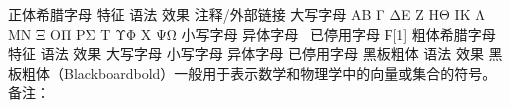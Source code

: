 正体希腊字母
特征	语法	效果	注释/外部链接
大写字母
\Alpha \Beta \Gamma \Delta \Epsilon \Zeta \Eta\Theta	\Alpha\Beta\Gamma\Delta\Epsilon\Zeta\Eta\Theta\!	
ΑΒ Γ ΔΕ Ζ ΗΘ
\Iota \Kappa \Lambda \Mu \Nu \Xi \Omicron \Pi	\Iota\Kappa\Lambda\Mu\Nu\Xi\Omicron\Pi\!	
ΙΚ Λ ΜΝ Ξ ΟΠ
\Rho \Sigma \Tau \Upsilon \Phi \Chi \Psi\Omega	\Rho\Sigma\Tau\Upsilon\Phi\Chi\Psi\Omega\!	
ΡΣ Τ ΥΦ Χ ΨΩ
小写字母
\alpha \beta \gamma \delta \epsilon \zeta \eta\theta	\alpha\beta\gamma\delta\epsilon\zeta\eta\theta\!	 
\iota \kappa\varkappa \lambda \mu \nu \xi \omicron\pi	\iota\kappa\varkappa\lambda\mu\nu\xi\omicron\pi\!	 
\rho \sigma \tau \upsilon \phi \chi \psi\omega	\rho\sigma\tau\upsilon\phi\chi\psi\omega\!	 
异体字母
\Epsilon\epsilon\varepsilon	\Epsilon\epsilon\varepsilon	 
\Theta\theta\vartheta	\Theta\theta\vartheta	 
\Kappa\kappa\varkappa	\Kappa\kappa\varkappa	 
\Pi\pi\varpi	\Pi\pi\varpi	 
\Rho\rho\varrho	\Rho\rho\varrho	 
\Sigma\sigma\varsigma	\Sigma\sigma\varsigma	 
\Phi\phi\varphi	\Phi\phi\varphi\,	 
已停用字母
\digamma	\digamma	
Ϝ[1]
粗体希腊字母
特征	语法	效果
大写字母
\boldsymbol{\Alpha \Beta \Gamma \Delta \Epsilon \Zeta\Eta \Theta}	\boldsymbol{\Alpha\Beta\Gamma\Delta\Epsilon\Zeta\Eta\Theta}
\boldsymbol{\Iota \Kappa \Lambda \Mu \Nu \Xi \Omicron\Pi}	\boldsymbol{\Iota\Kappa\Lambda\Mu\Nu\Xi\Omicron\Pi}
\boldsymbol{\Rho \Sigma \Tau \Upsilon \Phi \Chi \Psi\Omega}	\boldsymbol{\Rho\Sigma\Tau\Upsilon\Phi\Chi\Psi\Omega}
小写字母
\boldsymbol{\alpha \beta \gamma \delta \epsilon \zeta\eta \theta}	\boldsymbol{\alpha\beta\gamma\delta\epsilon\zeta\eta\theta}
\boldsymbol{\iota \kappa \lambda \mu \nu \xi \omicron\pi}	\boldsymbol{\iota\kappa\lambda\mu\nu\xi\omicron\pi}
\boldsymbol{\rho \sigma \tau \upsilon \phi \chi \psi\omega}	\boldsymbol{\rho\sigma\tau\upsilon\phi\chi\psi\omega}
异体字母
\boldsymbol{\Epsilon\epsilon\varepsilon}	\boldsymbol{\Epsilon\epsilon\varepsilon}
\boldsymbol{\Theta\theta\vartheta}	\boldsymbol{\Theta\theta\vartheta}
\boldsymbol{\Kappa\kappa\varkappa}	\boldsymbol{\Kappa\kappa\varkappa}
\boldsymbol{\Pi\pi\varpi}	\boldsymbol{\Pi\pi\varpi}
\boldsymbol{\Rho\rho\varrho}	\boldsymbol{\Rho\rho\varrho}
\boldsymbol{\Sigma\sigma\varsigma}	\boldsymbol{\Sigma\sigma\varsigma}
\boldsymbol{\Phi\phi\varphi}	\boldsymbol{\Phi\phi\varphi}
已停用字母
\boldsymbol{\digamma}	 
黑板粗体
语法
效果
\pagecolor{White}
黑板粗体（Blackboardbold）一般用于表示数学和物理学中的向量或集合的符号。 备注：


